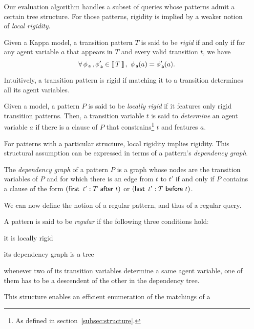 \documentclass[runningheads]{llncs}
\begin{document}
Our evaluation algorithm handles a subset of queries whose patterns
admit a certain tree structure. For those patterns, rigidity is
implied by a weaker notion of \emph{local rigidity}.
\begin{definition}
  Given a Kappa model, a transition pattern $T$ is said to be
  \emph{rigid} if and only if for any agent variable $a$ that appears
  in $T$ and every valid transition $t$, we have
  \[ \forall\, \phi_{\,\textsf{a}}\,, \phi_{\,\textsf{a}}' \in \left\llbracket \, T \, \right\rrbracket, \ \phi_{\,\textsf{a}}(a)
    = \phi'_{\,\textsf{a}}(a). \]
\end{definition}
Intuitively, a transition pattern is rigid if matching it to a
transition determines all its agent variables.
\begin{definition}
  Given a model, a pattern $P$ is said to be \emph{locally rigid} if
  it features only rigid transition patterns. Then, a transition
  variable $t$ is said to \emph{determine} an agent variable $a$ if
  there is a clause of $P$ that constrains\footnote{As defined in
    section~\ref{subsec:structure}.} $t$ and features $a$.
\end{definition}
For patterns with a particular structure, local rigidity implies
rigidity. This structural assumption can be expressed in terms of a
pattern's \emph{dependency graph}.
\begin{definition}
  The \emph{dependency graph} of a pattern $P$ is a graph whose nodes
  are the transition variables of $P$ and for which there is an edge
  from $t$ to $t'$ if and only if $P$ contains a clause of the form
  $(\textsf{first} \,\ t':T \ \textsf{after} \ t)$ or $(\textsf{last} \,\ t':T \ \textsf{before} \ t)$.
\end{definition}
We can now define the notion of a regular pattern, and thus of a
regular query.
\begin{definition}\label{def:regularity}
  A pattern is said to be \emph{regular} if the following three
  conditions hold:
  \begin{inparaenum}[(i)]
  \item\label{reg:locally-rigid} it is locally rigid
  \item\label{reg:tree} its dependency graph is a tree
  \item\label{reg:well-captured} whenever two of its transition
    variables determine a same agent variable, one of them has to be a
    descendent of the other in the dependency tree.
  \end{inparaenum}
\end{definition}
This structure enables an efficient enumeration of the matchings of a
\end{document}
